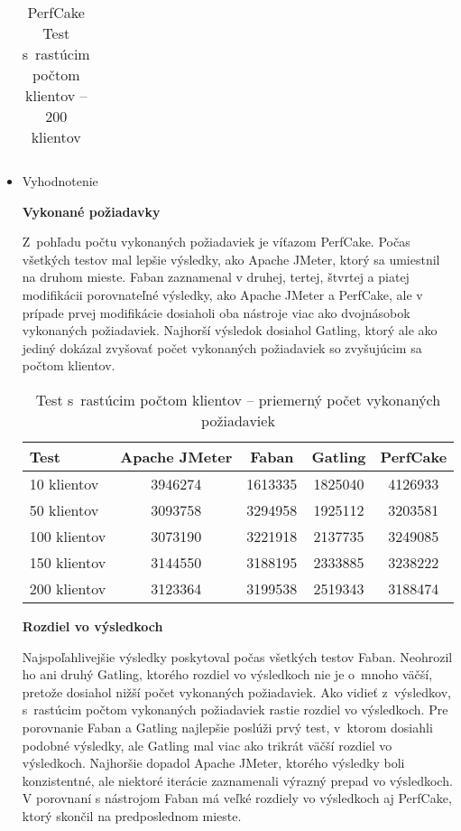 \documentclass[12pt,oneside,final]{fithesis-utf8}
\begin{document}
\begin{itemize}
\begin{table}[H]
\begin{center}
\begin{tabular}{ | l | c | c | c | c |}
\end{tabular}
\end{center}
\caption{PerfCake Test s~rastúcim počtom klientov -- 200 klientov}
\end{table}

\item Vyhodnotenie

\textbf{Vykonané požiadavky}

Z~pohľadu počtu vykonaných požiadaviek je víťazom PerfCake. Počas všetkých testov mal lepšie výsledky, ako Apache JMeter, ktorý sa umiestnil na druhom mieste. Faban zaznamenal v druhej, tertej, štvrtej a piatej modifikácii porovnateľné výsledky, ako Apache JMeter a PerfCake, ale v prípade prvej modifikácie dosiaholi oba nástroje viac ako dvojnásobok vykonaných požiadaviek. Najhorší výsledok dosiahol Gatling, ktorý ale ako jediný dokázal zvyšovať počet vykonaných požiadaviek so zvyšujúcim sa počtom klientov.

\begin{table}[H]
\begin{center}
\begin{tabular}{ | l | c | c | c | c |}
		\hline
		 \textbf{Test} & \textbf{Apache JMeter} & \textbf{Faban} & \textbf{Gatling} & \textbf{PerfCake} \\ \hline
		 10 klientov & 3946274 & 1613335 & 1825040 & 4126933 \\ \hline
 		 50 klientov & 3093758 & 3294958 & 1925112 & 3203581 \\ \hline
 		 100 klientov & 3073190 & 3221918 & 2137735 & 3249085 \\ \hline
 		 150 klientov & 3144550 & 3188195 & 2333885 & 3238222 \\ \hline
		 200 klientov & 3123364 & 3199538 & 2519343 & 3188474 \\ \hline
		 
\end{tabular}
\end{center}
\caption{Test s~rastúcim počtom klientov -- priemerný počet vykonaných požiadaviek}
\end{table}

\textbf{Rozdiel vo výsledkoch}

Najspoľahlivejšie výsledky poskytoval počas všetkých testov Faban. Neohrozil ho ani druhý Gatling, ktorého rozdiel vo výsledkoch nie je o~mnoho väčší, pretože dosiahol nižší počet vykonaných požiadaviek. Ako vidieť z~výsledkov, s~rastúcim počtom vykonaných požiadaviek rastie rozdiel vo výsledkoch. Pre porovnanie Faban a Gatling najlepšie poslúži prvý test, v~ktorom dosiahli podobné výsledky, ale Gatling mal viac ako trikrát väčší rozdiel vo výsledkoch. Najhoršie dopadol Apache JMeter, ktorého výsledky boli konzistentné, ale niektoré iterácie zaznamenali výrazný prepad vo výsledkoch. V porovnaní s nástrojom Faban má veľké rozdiely vo výsledkoch aj PerfCake, ktorý skončil na predposlednom mieste.


\end{itemize}
\end{document}
